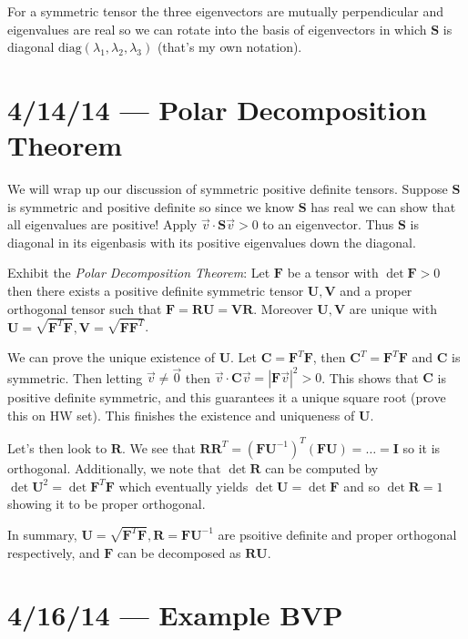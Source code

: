 \documentclass[10pt]{report}
\newcommand{\abs}[1]{\left|#1\right|}
\begin{document}
For a symmetric tensor the three eigenvectors are mutually perpendicular and eigenvalues are real so we can rotate into the basis of eigenvectors in which $\mathbf{S}$ is diagonal $\mathrm{diag}(\lambda_1, \lambda_2, \lambda_3)$ (that's my own notation).

\chapter{4/14/14 --- Polar Decomposition Theorem}

We will wrap up our discussion of symmetric positive definite tensors. Suppose $\mathbf{S}$ is symmetric and positive definite so since we know $\mathbf{S}$ has real we can show that all eigenvalues are positive! Apply $\vec{v}\cdot\mathbf{S}\vec{v} > 0$ to an eigenvector. Thus $\mathbf{S}$ is diagonal in its eigenbasis with its positive eigenvalues down the diagonal. 

Exhibit the \emph{Polar Decomposition Theorem}: Let $\mathbf{F}$ be a tensor with $\det \mathbf{F} > 0$ then there exists a positive definite symmetric tensor $\mathbf{U}, \mathbf{V}$ and a proper orthogonal tensor such that $\mathbf{F} = \mathbf{RU} = \mathbf{VR}$. Moreover $\mathbf{U}, \mathbf{V}$ are unique with $\mathbf{U} = \sqrt{\mathbf{F}^T\mathbf{F}}, \mathbf{V} = \sqrt{\mathbf{F}\mathbf{F}^T}$.

We can prove the unique existence of $\mathbf{U}$. Let $\mathbf{C} = \mathbf{F}^T\mathbf{F}$, then $\mathbf{C}^T = \mathbf{F}^T\mathbf{F}$ and $\mathbf{C}$ is symmetric. Then letting $\vec{v} \neq \vec{0}$ then $\vec{v}\cdot\mathbf{C}\vec{v} = \abs{\mathbf{F}\vec{v}}^2 > 0$. This shows that $\mathbf{C}$ is positive definite symmetric, and this guarantees it a unique square root (prove this on HW set). This finishes the existence and uniqueness of $\mathbf{U}$.

Let's then look to $\mathbf{R}$. We see that $\mathbf{R}\mathbf{R}^T = (\mathbf{FU}^{-1})^T(\mathbf{FU}) = \dots = \mathbf{I}$ so it is orthogonal. Additionally, we note that $\det \mathbf{R}$ can be computed by $\det \mathbf{U}^2 = \det\mathbf{F}^T\mathbf{F}$ which eventually yields $\det \mathbf{U} = \det \mathbf{F}$ and so $\det \mathbf{R} = 1$ showing it to be proper orthogonal.

In summary, $\mathbf{U} = \sqrt{\mathbf{F}^T\mathbf{F}}, \mathbf{R} = \mathbf{F} \mathbf{U}^{-1}$ are psoitive definite and proper orthogonal respectively, and $\mathbf{F}$ can be decomposed as $\mathbf{RU}$. 

\chapter{4/16/14 --- Example BVP}
\end{document}

